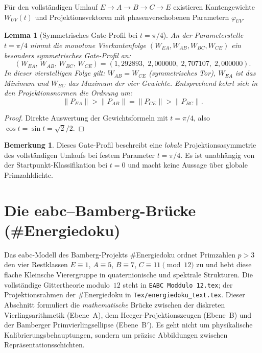 \documentclass[11pt,a4paper]{article}
\theoremstyle{definition}
\newtheorem{bemerkung}[definition]{Bemerkung}
\theoremstyle{plain}
\newtheorem{lemma}[definition]{Lemma}
\begin{document}
	Für den vollständigen Umlauf $E\to A\to B\to C\to E$ existieren Kantengewichte $W_{UV}(t)$ und Projektionsvektoren mit phasenverschobenen Parametern $\varphi_{UV}$.
	
	\begin{lemma}[Symmetrisches Gate-Profil bei $t=\pi/4$]
		An der Parameterstelle $t=\pi/4$ nimmt die monotone Vierkantenfolge $(W_{EA},W_{AB},W_{BC},W_{CE})$ ein besonders symmetrisches Gate-Profil an:
		\[
		(W_{EA},\,W_{AB},\,W_{BC},\,W_{CE})
		=
		(1{,}292893,\;2{,}000000,\;2{,}707107,\;2{,}000000).
		\]
		In dieser vierstelligen Folge gilt: $W_{AB}=W_{CE}$ (symmetrisches Tor), $W_{EA}$ ist das Minimum und $W_{BC}$ das Maximum der vier Gewichte. Entsprechend kehrt sich in den Projektionsnormen die Ordnung um:
		\[
		\|P_{EA}\|>\|P_{AB}\|=\|P_{CE}\|>\|P_{BC}\|.
		\]
	\end{lemma}
	
	\begin{proof}
		Direkte Auswertung der Gewichtsformeln mit $t=\pi/4$, also $\cos t=\sin t=\sqrt{2}/2$.
	\end{proof}
	
	\begin{bemerkung}
		Dieses Gate-Profil beschreibt eine \emph{lokale} Projektionsasymmetrie des vollständigen Umlaufs bei festem Parameter $t=\pi/4$. Es ist unabhängig von der Startpunkt-Klassifikation bei $t=0$ und macht keine Aussage über globale Primzahldichte.
	\end{bemerkung}
	
	\section{Die eabc--Bamberg-Brücke (\#Energiedoku)}\label{sec:eabc-bamberg}
	
	Das eabc-Modell des Bamberg-Projekts \#Energiedoku ordnet Primzahlen $p>3$ den vier Restklassen $E\equiv1$, $A\equiv5$, $B\equiv7$, $C\equiv11\pmod{12}$ zu und hebt diese flache Kleinsche Vierergruppe in quaternionische und spektrale Strukturen. Die vollständige Gittertheorie modulo~$12$ steht in \texttt{EABC Moddulo 12.tex}; der Projektionsrahmen der \#Energiedoku in \texttt{Tex/energiedoku\_text.tex}. Dieser Abschnitt formuliert die \emph{mathematische} Brücke zwischen der diskreten Vierlingsarithmetik (Ebene~A), dem Heeger-Projektionszeugen (Ebene~B) und der Bamberger Primvierlingsellipse (Ebene~B$'$). Es geht nicht um physikalische Kalibrierungsbehauptungen, sondern um präzise Abbildungen zwischen Repräsentationsschichten.
	
\end{document}
